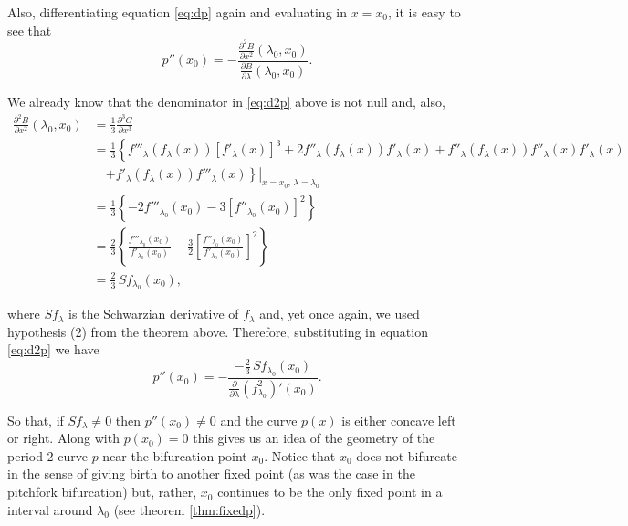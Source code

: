 \documentclass[10pt,twoside,titlepage]{book}
\numberwithin{equation}{chapter}
\numberwithin{figure}{chapter}
\numberwithin{table}{chapter}
\theoremstyle{plain}%
\theoremstyle{definition}
\theoremstyle{remark}
\begin{document}
Also, differentiating equation \eqref{eq:dp} again and evaluating in $x=x_0$, it is easy to see that
\begin{equation}
	\label{eq:d2p}
	p''(x_0)=-\frac{\frac{\partial^2 B}{\partial x^2}(\lambda_0,x_0)}{\frac{\partial B}{\partial\lambda}(\lambda_0,x_0)}.
\end{equation}

We already know that the denominator in \eqref{eq:d2p} above is not null and, also,
\begin{equation}
	\begin{aligned}
		\frac{\partial^2 B}{\partial x^2}(\lambda_0,x_0)	& =\frac{1}{3}\frac{\partial^3 G}{\partial x^3}\\
		& =\frac{1}{3}\left\{f'''_{\lambda}(f_{\lambda}(x))\left[f'_{\lambda}(x)\right]^3+2f''_{\lambda}(f_{\lambda}(x))f'_{\lambda}(x)+f''_{\lambda}(f_{\lambda}(x))f''_{\lambda}(x)f'_{\lambda}(x)\right.\\
		& \quad\left.\left.+f'_{\lambda}(f_{\lambda}(x))f'''_{\lambda}(x)\right\}\right|_{x=x_0,\,\lambda=\lambda_0}\\
		& =\frac{1}{3}\left\{-2f'''_{\lambda_0}(x_0)-3[f''_{\lambda_0}(x_0)]^2\right\}\\
		& =\frac{2}{3}\left\{\frac{f'''_{\lambda_0}(x_0)}{f'_{\lambda_0}(x_0)}-\frac{3}{2}\left[\frac{f''_{\lambda_0}(x_0)}{f'_{\lambda_0}(x_0)}\right]^2\right\}\\
		& =\frac{2}{3}\,Sf_{\lambda_0}(x_0),
	\end{aligned}
\end{equation}

where $Sf_{\lambda}$ is the Schwarzian derivative of $f_{\lambda}$ and, yet once again, we used hypothesis (2) from the theorem above. Therefore, substituting in equation \eqref{eq:d2p} we have
\begin{equation}
	p''(x_0)=-\frac{-\frac{2}{3}\,Sf_{\lambda_0}(x_0)}{\frac{\partial}{\partial\lambda}(f^2_{\lambda_0})'(x_0)}.
\end{equation}

So that, if $Sf_{\lambda}\neq0$ then $p''(x_0)\neq0$ and the curve $p(x)$ is either concave left or right. Along with $p(x_0)=0$ this gives us an idea of the geometry of the period 2 curve $p$ near the bifurcation point $x_0$. Notice that $x_0$ does not bifurcate in the sense of giving birth to another fixed point (as was the case in the pitchfork bifurcation) but, rather, $x_0$ continues to be the only fixed point in a interval around $\lambda_0$ (see theorem \ref{thm:fixedp}).
\end{document}
